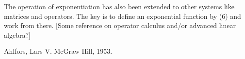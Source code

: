 The operation of exponentiation has also been extended to other systems
like matrices and operators.  The key is to define an exponential
function by (6) and work from there.  [Some reference on operator
calculus and/or advanced linear algebra?]

\Ref

  {Ahlfors, Lars V.}  {McGraw-Hill, 1953.}
